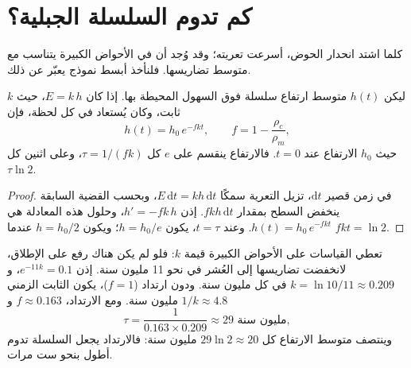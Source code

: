 \section{كم تدوم السلسلة الجبلية؟}

كلما اشتد انحدار الحوض، أسرعت تعريته؛ وقد وُجد أن 
في الأحواض الكبيرة يتناسب مع متوسط تضاريسها. فلنأخذ
أبسط نموذج يعبّر عن ذلك.

\begin{proposition}\label{prop:g12:destruction-of-mountains:decay}
ليكن $h(t)$ متوسط ارتفاع سلسلة فوق السهول المحيطة بها. إذا كان
 $E = k\,h$، حيث $k$ ثابت، وكان 
يُستعاد في كل لحظة، فإن
\[
  h(t) = h_0\, e^{-f k t}, \qquad f = 1 - \frac{\rho_c}{\rho_m},
\]
حيث $h_0$ الارتفاع عند $t = 0$. فالارتفاع ينقسم على $e$
كل $\tau = 1/(fk)$، وعلى اثنين كل $\tau \ln 2$.
\end{proposition}

\begin{proof}
في زمن قصير $\mathrm{d}t$، تزيل التعرية سمكًا $E\,\mathrm{d}t
= k h\,\mathrm{d}t$، وبحسب القضية السابقة ينخفض السطح
بمقدار $f k h\,\mathrm{d}t$. إذن $h' = -fk\,h$، وحلول هذه
المعادلة هي $h(t) = h_0\,e^{-fkt}$. وعند $t = \tau$، يكون $h = h_0/e$؛ ويكون $h = h_0/2$
عندما $fkt = \ln 2$.
\end{proof}

تعطي القياسات على الأحواض الكبيرة قيمة $k$: فلو لم يكن هناك رفع على الإطلاق، لانخفضت
تضاريسها إلى العُشر في نحو 11 مليون سنة. إذن $e^{-11k} = 0.1$، و$k =
\ln 10/11 \approx 0.209$ في كل مليون سنة. ودون ارتداد ($f = 1$)، يكون
الثابت الزمني $1/k \approx 4.8$ مليون سنة. ومع الارتداد، $f
\approx 0.163$
و\[
  \tau = \frac{1}{0.163 \times 0.209} \approx 29 \text{ مليون سنة},
\]
وينتصف متوسط الارتفاع كل $29 \ln 2 \approx 20$ مليون سنة:
فالارتداد يجعل السلسلة تدوم أطول بنحو ست مرات.

